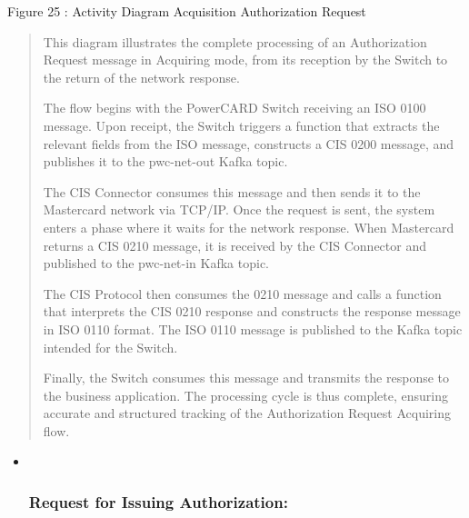 \documentclass[12pt,a4paper]{report}
\begin{document}
\protect\hypertarget{_Toc201954501}{}{}Figure 25 : Activity Diagram
Acquisition Authorization Request

\begin{quote}
This diagram illustrates the complete processing of an Authorization
Request message in Acquiring mode, from its reception by the Switch to
the return of the network response.

The flow begins with the PowerCARD Switch receiving an ISO 0100 message.
Upon receipt, the Switch triggers a function that extracts the relevant
fields from the ISO message, constructs a CIS 0200 message, and
publishes it to the pwc-net-out Kafka topic.

The CIS Connector consumes this message and then sends it to the
Mastercard network via TCP/IP. Once the request is sent, the system
enters a phase where it waits for the network response. When Mastercard
returns a CIS 0210 message, it is received by the CIS Connector and
published to the pwc-net-in Kafka topic.

The CIS Protocol then consumes the 0210 message and calls a function
that interprets the CIS 0210 response and constructs the response
message in ISO 0110 format. The ISO 0110 message is published to the
Kafka topic intended for the Switch.

Finally, the Switch consumes this message and transmits the response to
the business application. The processing cycle is thus complete,
ensuring accurate and structured tracking of the Authorization Request
Acquiring flow.
\end{quote}

\begin{itemize}
\item ~
  \hypertarget{request-for-issuing-authorization}{%
  \subsubsection{\texorpdfstring{\textbf{Request for Issuing
  Authorization:}}{Request for Issuing Authorization:}}\label{request-for-issuing-authorization}}
\end{itemize}
\end{document}
